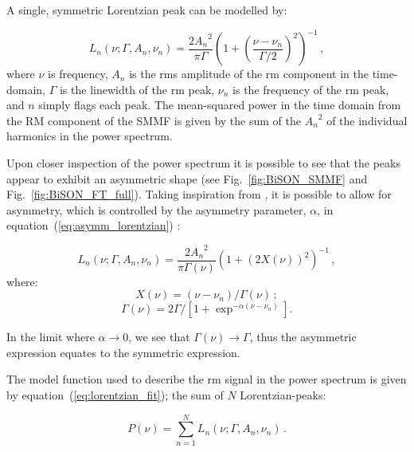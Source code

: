 A single, symmetric Lorentzian peak can be modelled by:

\begin{equation}
L_n(\nu; \Gamma, A_n, \nu_n) = \frac{2{A_n}^2}{\pi \Gamma} \left(1 + \left(\frac{\nu - \nu_{n}}{\Gamma /2}\right)^2\right)^{-1} \, ,
\label{eq:symm_lorentzian}
\end{equation}
%
where $\nu$ is frequency, $A_n$ is the \gls{rms} amplitude of the \gls{rm} component in the time-domain, $\Gamma$ is the linewidth of the \gls{rm} peak, $\nu_n$ is the frequency of the \gls{rm} peak, and $n$ simply flags each peak. The mean-squared power in the time domain from the RM component of the SMMF is given by the sum of the ${A_n}^2$ of the individual harmonics in the power spectrum.

Upon closer inspection of the power spectrum it is possible to see that the peaks appear to exhibit an asymmetric shape (see Fig.~\ref{fig:BiSON_SMMF} and Fig.~\ref{fig:BiSON_FT_full}). Taking inspiration from \citet{howe_solar_2020}, it is possible to allow for asymmetry, which is controlled by the asymmetry parameter, $\alpha$, in equation~(\ref{eq:asymm_lorentzian}) \citep{stancik_simple_2008}:

\begin{equation}
L_n(\nu; \Gamma, A_n, \nu_n) = \frac{2{A_n}^2}{\pi \Gamma(\nu)} \left(1 + \left(2X(\nu)\right)^2\right)^{-1} \, ,
\label{eq:asymm_lorentzian}
\end{equation}
%
where:
%
\begin{equation}
X(\nu) = (\nu - \nu_n)/\Gamma(\nu) \, ;
\label{eq:asymm_freq}
\end{equation}
%
\begin{equation}
\Gamma(\nu) = 2\Gamma / [1 + \exp^{-\alpha(\nu - \nu_n)}] .
\label{eq:asymm_width}
\end{equation}

In the limit where $\alpha \rightarrow 0$, we see that $\Gamma(\nu) \rightarrow \Gamma$, thus the asymmetric expression equates to the symmetric expression.

The model function used to describe the \gls{rm} signal in the power spectrum is given by equation~(\ref{eq:lorentzian_fit}); the sum of $N$ Lorentzian-peaks:

\begin{equation}
P(\nu) = \sum_{n=1}^{N} L_n(\nu; \Gamma, A_n, \nu_n) \, .
\label{eq:lorentzian_fit}
\end{equation}


